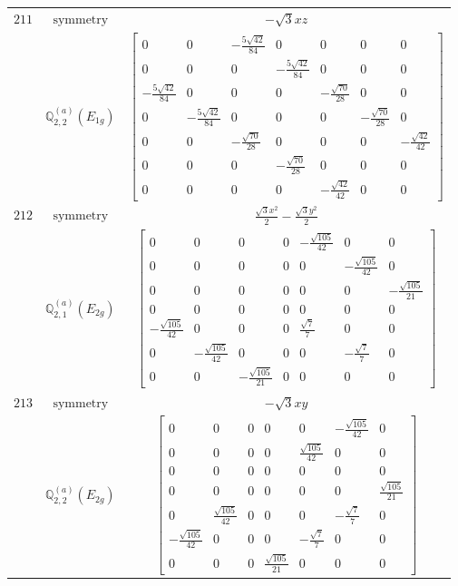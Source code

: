 \documentclass[fleqn,8pt,landscape]{jsarticle}
\begin{document}
\begin{longtable}{ccc}
$ 211 $ & $ \text{symmetry} $ & $ - \sqrt{3} x z $ \\
$  $ & $ \mathbb{Q}_{2,2}^{(a)}(E_{1g}) $ & $ \begin{bmatrix} 0 & 0 & - \frac{5 \sqrt{42}}{84} & 0 & 0 & 0 & 0 \\ 0 & 0 & 0 & - \frac{5 \sqrt{42}}{84} & 0 & 0 & 0 \\ - \frac{5 \sqrt{42}}{84} & 0 & 0 & 0 & - \frac{\sqrt{70}}{28} & 0 & 0 \\ 0 & - \frac{5 \sqrt{42}}{84} & 0 & 0 & 0 & - \frac{\sqrt{70}}{28} & 0 \\ 0 & 0 & - \frac{\sqrt{70}}{28} & 0 & 0 & 0 & - \frac{\sqrt{42}}{42} \\ 0 & 0 & 0 & - \frac{\sqrt{70}}{28} & 0 & 0 & 0 \\ 0 & 0 & 0 & 0 & - \frac{\sqrt{42}}{42} & 0 & 0 \end{bmatrix} $ \\ \hline
$ 212 $ & $ \text{symmetry} $ & $ \frac{\sqrt{3} x^{2}}{2} - \frac{\sqrt{3} y^{2}}{2} $ \\
$  $ & $ \mathbb{Q}_{2,1}^{(a)}(E_{2g}) $ & $ \begin{bmatrix} 0 & 0 & 0 & 0 & - \frac{\sqrt{105}}{42} & 0 & 0 \\ 0 & 0 & 0 & 0 & 0 & - \frac{\sqrt{105}}{42} & 0 \\ 0 & 0 & 0 & 0 & 0 & 0 & - \frac{\sqrt{105}}{21} \\ 0 & 0 & 0 & 0 & 0 & 0 & 0 \\ - \frac{\sqrt{105}}{42} & 0 & 0 & 0 & \frac{\sqrt{7}}{7} & 0 & 0 \\ 0 & - \frac{\sqrt{105}}{42} & 0 & 0 & 0 & - \frac{\sqrt{7}}{7} & 0 \\ 0 & 0 & - \frac{\sqrt{105}}{21} & 0 & 0 & 0 & 0 \end{bmatrix} $ \\ \hline
$ 213 $ & $ \text{symmetry} $ & $ - \sqrt{3} x y $ \\
$  $ & $ \mathbb{Q}_{2,2}^{(a)}(E_{2g}) $ & $ \begin{bmatrix} 0 & 0 & 0 & 0 & 0 & - \frac{\sqrt{105}}{42} & 0 \\ 0 & 0 & 0 & 0 & \frac{\sqrt{105}}{42} & 0 & 0 \\ 0 & 0 & 0 & 0 & 0 & 0 & 0 \\ 0 & 0 & 0 & 0 & 0 & 0 & \frac{\sqrt{105}}{21} \\ 0 & \frac{\sqrt{105}}{42} & 0 & 0 & 0 & - \frac{\sqrt{7}}{7} & 0 \\ - \frac{\sqrt{105}}{42} & 0 & 0 & 0 & - \frac{\sqrt{7}}{7} & 0 & 0 \\ 0 & 0 & 0 & \frac{\sqrt{105}}{21} & 0 & 0 & 0 \end{bmatrix} $ \\ \hline

\end{longtable}
\end{document}
